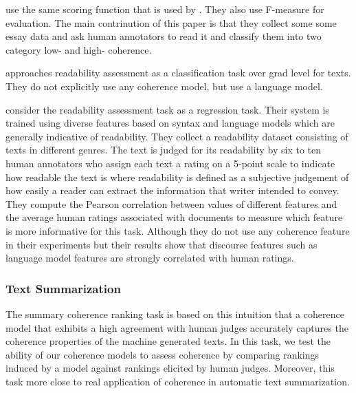  use the same scoring function that is used by . 
They also use F-measure for evaluation. 
The main contrinution of this paper is that they collect some some essay data and ask human annotators to read it and classify them into two category low- and high- coherence. 

 approaches readability assessment as a classification task over grad level for texts. They do not explicitly use any coherence model, but use a language model. 

 consider the readability assessment task as a regression task. 
Their system is trained using diverse features based on syntax and language models which are generally indicative of readability. 
They collect a readability dataset consisting of texts in different genres. 
The text  is judged for its readability by six to ten human annotators who assign each text a rating on a 5-point scale to indicate how readable the text is where readability is defined as a subjective judgement of how easily a reader can extract the information that writer intended to convey. 
They compute the Pearson correlation between values of different features and the average human ratings associated with documents to measure which feature is more informative for this task. 
Although they do not use any coherence feature in their experiments but their results show that discourse features such as language model features are strongly correlated with human ratings. 

\subsubsection{Text Summarization}
The summary coherence ranking task is based on this intuition that a coherence model that exhibits a high agreement with human judges accurately captures the coherence properties of the machine generated texts. 
In this task, we test the ability of our coherence models to assess coherence by comparing rankings induced by a model against rankings elicited by human judges. 
Moreover, this task more close to real application of coherence in automatic text summarization.


